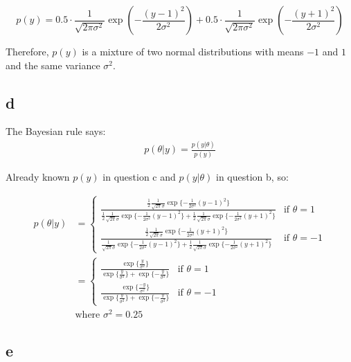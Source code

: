 $$p(y) = 0.5 \cdot \frac{1}{\sqrt{2 \pi \sigma^2}} \exp \left(-\frac{(y - 1)^2}{2 \sigma^2}\right) + 0.5 \cdot \frac{1}{\sqrt{2 \pi \sigma^2}} \exp \left(-\frac{(y + 1)^2}{2 \sigma^2}\right)$$

Therefore, $p(y)$ is a mixture of two normal distributions with means $-1$ and $1$ and the same variance $\sigma^2$.

\subsection{d}

The Bayesian rule says:
\begin{equation}
    \begin{aligned}
        p(\theta|y)= \frac{p(y|\theta)}{p(y)}\nonumber
    \end{aligned}
\end{equation}

Already known $ p(y) $ in question c and $ p(y|\theta) $ in question b, so:

\begin{equation}
    \begin{aligned}
        p(\theta|y)&=\begin{cases}\frac{\frac{1}{2}\frac{1}{\sqrt{2\pi}\sigma}\exp\{-\frac{1}{2\sigma^2}(y-1)^2\}}{\frac{1}{2}\frac{1}{\sqrt{2\pi}\sigma}\exp\{-\frac{1}{2\sigma^2}(y-1)^2\}+\frac{1}{2}\frac{1}{\sqrt{2\pi}\sigma}\exp\{-\frac{1}{2\sigma^2}(y+1)^2\}}& \text{if } \theta =1\\ \frac{\frac{1}{2}\frac{1}{\sqrt{2\pi}\sigma}\exp\{-\frac{1}{2\sigma^2}(y+1)^2\}}{\frac{1}{\sqrt{2\pi}\sigma}\exp\{-\frac{1}{2\sigma^2}(y-1)^2\}+\frac{1}{2}\frac{1}{\sqrt{2\pi}\sigma}\exp\{-\frac{1}{2\sigma^2}(y+1)^2\}}&\text{if } \theta=-1\end{cases}\\
        &=\begin{cases}\frac{\exp\{\frac{y}{\sigma^2}\}}{\exp\{\frac{y}{\sigma^2}\}+\exp\{-\frac{y}{\sigma^2}\}}&\text{if } \theta =1\\ \frac{\exp\{\frac{-y}{\sigma^2}\}}{\exp\{\frac{y}{\sigma^2}\}+\exp\{-\frac{y}{\sigma^2}\}}&\text{if } \theta =-1\end{cases}\\
        &\text{where  }  \sigma^2=0.25\nonumber
    \end{aligned} 
\end{equation}

\subsection{e}

